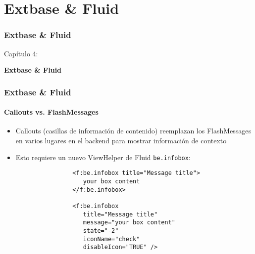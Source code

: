 %

\section{Extbase \& Fluid}
\begin{frame}[fragile]
	\frametitle{Extbase \& Fluid}

	\begin{center}\huge{Capítulo 4:}\end{center}
	\begin{center}\huge{\color{typo3darkgrey}\textbf{Extbase \& Fluid}}\end{center}

\end{frame}


\begin{frame}[fragile]
	\frametitle{Extbase \& Fluid}
	\framesubtitle{Callouts vs. FlashMessages}

	\begin{itemize}

		\item Callouts (casillas de información de contenido) reemplazan los FlashMessages
			en varios lugares en el backend para mostrar información de contexto

		\item Esto requiere un nuevo ViewHelper de Fluid  \texttt{be.infobox}:

			\begin{lstlisting}
				<f:be.infobox title="Message title">
				   your box content
				</f:be.infobox>

				<f:be.infobox
				   title="Message title"
				   message="your box content"
				   state="-2"
				   iconName="check"
				   disableIcon="TRUE" />
			\end{lstlisting}

	\end{itemize}

\end{frame}

